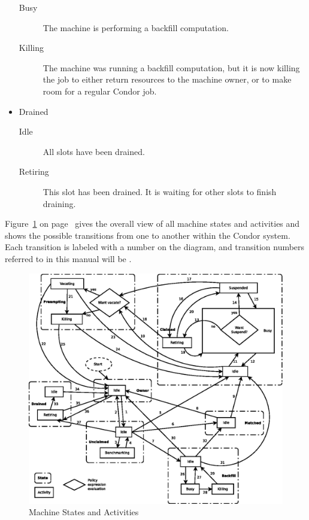 \begin{itemize}
\begin{description}
\item[Busy] The machine is performing a backfill computation.

\item[Killing] The machine was running a backfill computation, but it
  is now killing the job to either return resources to the machine
  owner, or to make room for a regular Condor job.

\end{description}

\item Drained
\begin{description}

\item[Idle] All slots have been drained.

\item[Retiring] This slot has been drained.  It is waiting for other
  slots to finish draining.

\end{description}

\end{itemize}

Figure~\ref{fig:machine-activities} on
page~\pageref{fig:machine-activities} gives the overall view of all
machine states and activities and shows the possible transitions
from one to another within the Condor system.  
Each transition is labeled with a number on the diagram, and
transition numbers referred to in this manual will be .  

\begin{figure}[hbt]
\centering
\includegraphics{admin-man/activities.eps}
\caption{\label{fig:machine-activities}Machine States and Activities}
\end{figure}

